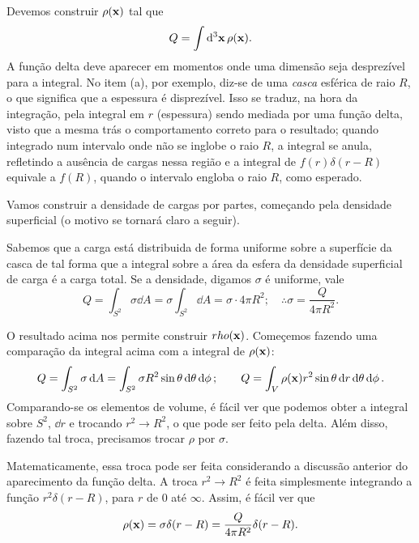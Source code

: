 Devemos construir $\rho(\vb{x})$ tal que
\[
  Q = \int \dd[3]{\vb{x}} \rho(\vb{x}).
\]
A função delta deve aparecer em momentos onde uma dimensão seja desprezível para a integral. No item (a), por exemplo, diz-se de uma \textit{casca} esférica de raio $R$, o que significa que a espessura é disprezível. Isso se traduz, na hora da integração, pela integral em $r$ (espessura) sendo mediada por uma função delta, visto que a mesma trás o comportamento correto para o resultado; quando integrado num intervalo onde não se inglobe o raio $R$, a integral se anula, refletindo a ausência de cargas nessa região e a integral de $f(r) \delta(r - R)$ equivale a $f(R)$, quando o intervalo engloba o raio $R$, como esperado.

Vamos construir a densidade de cargas por partes, começando pela densidade superficial (o motivo se tornará claro a seguir).

Sabemos que a carga está distribuida de forma uniforme sobre a superfície da casca de tal forma que a integral sobre a área da esfera da densidade superficial de carga é a carga total. Se a densidade, digamos $\sigma$ é uniforme, vale
\[
  Q = \int_{S^2} \sigma \dd{A} = \sigma \int_{S^2} \dd{A} = \sigma \cdot 4\pi R^2;
  \quad
  \therefore \sigma = \frac{Q}{4\pi R^2}.
\]

O resultado acima nos permite construir $rho(\vb{x})$. Começemos fazendo uma comparação da integral acima com a integral de $\rho(\vb{x})$:
\begin{equation*}
  Q = \int_{S^2} \sigma \dd{A} = \int_{S^2} \sigma R^2 \sin \theta \dd{\theta} \dd{\phi};
  \qquad
  Q = \int_V \rho(\vb{x}) r^2 \sin \theta \dd{r} \dd{\theta} \dd{\phi}.
\end{equation*}
Comparando-se os elementos de volume, é fácil ver que podemos obter a integral sobre $S^2$,  $\dd{r}$ e trocando $r^2 \to R^2$, o que pode ser feito pela delta. Além disso, fazendo tal troca, precisamos trocar $\rho$ por $\sigma$.

Matematicamente, essa troca pode ser feita considerando a discussão anterior do aparecimento da função delta. A troca $r^2 \to R^2$ é feita simplesmente integrando a função $r^2 \delta(r - R)$, para $r$ de $0$ até $\infty$. Assim, é fácil ver que
\[
  \rho(\vb{x}) = \sigma \delta(r - R) = \frac{Q}{4\pi R^2} \delta(r - R).
\]




